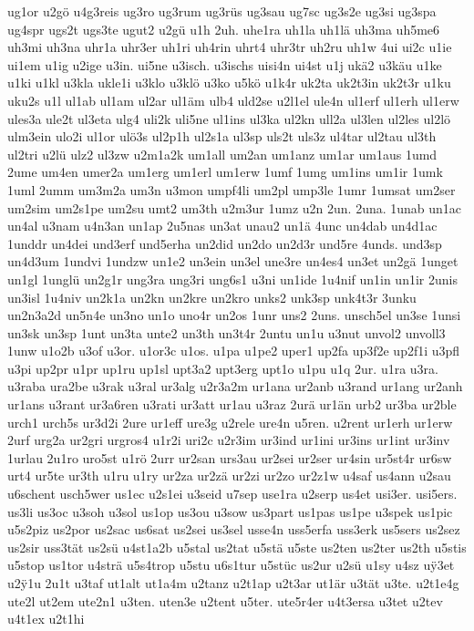 {ug1or
u2gö
u4g3reis
ug3ro
ug3rum
ug3rüs
ug3sau
ug7sc
ug3s2e
ug3si
ug3spa
ug4spr
ugs2t
ugs3te
ugut2
u2gü
u1h
2uh.
uhe1ra
uh1la
uh1lä
uh3ma
uh5me6
uh3mi
uh3na
uhr1a
uhr3er
uh1ri
uh4rin
uhrt4
uhr3tr
uh2ru
uh1w
4ui
ui2c
u1ie
ui1em
u1ig
u2ige
u3in.
ui5ne
u3isch.
u3ischs
uisi4n
ui4st
u1j
ukä2
u3käu
u1ke
u1ki
u1kl
u3kla
ukle1i
u3klo
u3klö
u3ko
u5kö
u1k4r
uk2ta
uk2t3in
uk2t3r
u1ku
uku2s
u1l
ul1ab
ul1am
ul2ar
ul1äm
ulb4
uld2se
u2l1el
ule4n
ul1erf
ul1erh
ul1erw
ules3a
ule2t
ul3eta
ulg4
uli2k
uli5ne
ul1ins
ul3ka
ul2kn
ull2a
ul3len
ul2les
ul2lö
ulm3ein
ulo2i
ul1or
ulö3s
ul2p1h
ul2s1a
ul3sp
uls2t
uls3z
ul4tar
ul2tau
ul3th
ul2tri
u2lü
ulz2
ul3zw
u2m1a2k
um1all
um2an
um1anz
um1ar
um1aus
1umd
2ume
um4en
umer2a
um1erg
um1erl
um1erw
1umf
1umg
um1ins
um1ir
1umk
1uml
2umm
um3m2a
um3n
u3mon
umpf4li
um2pl
ump3le
1umr
1umsat
um2ser
um2sim
um2s1pe
um2su
umt2
um3th
u2m3ur
1umz
u2n
2un.
2una.
1unab
un1ac
un4al
u3nam
u4n3an
un1ap
2u5nas
un3at
unau2
un1ä
4unc
un4dab
un4d1ac
1unddr
un4dei
und3erf
und5erha
un2did
un2do
un2d3r
und5re
4unds.
und3sp
un4d3um
1undvi
1undzw
un1e2
un3ein
un3el
une3re
un4es4
un3et
un2gä
1unget
un1gl
1unglü
un2g1r
ung3ra
ung3ri
ung6s1
u3ni
un1ide
1u4nif
un1in
un1ir
2unis
un3isl
1u4niv
un2k1a
un2kn
un2kre
un2kro
unks2
unk3sp
unk4t3r
3unku
un2n3a2d
un5n4e
un3no
un1o
uno4r
un2os
1unr
uns2
2uns.
unsch5el
un3se
1unsi
un3sk
un3sp
1unt
un3ta
unte2
un3th
un3t4r
2untu
un1u
u3nut
unvol2
unvoll3
1unw
u1o2b
u3of
u3or.
u1or3c
u1os.
u1pa
u1pe2
uper1
up2fa
up3f2e
up2f1i
u3pfl
u3pi
up2pr
u1pr
up1ru
up1sl
upt3a2
upt3erg
upt1o
u1pu
u1q
2ur.
u1ra
u3ra.
u3raba
ura2be
u3rak
u3ral
ur3alg
u2r3a2m
ur1ana
ur2anb
u3rand
ur1ang
ur2anh
ur1ans
u3rant
ur3a6ren
u3rati
ur3att
ur1au
u3raz
2urä
ur1än
urb2
ur3ba
ur2ble
urch1
urch5s
ur3d2i
2ure
ur1eff
ure3g
u2rele
ure4n
u5ren.
u2rent
ur1erh
ur1erw
2urf
urg2a
ur2gri
urgros4
u1r2i
uri2c
u2r3im
ur3ind
ur1ini
ur3ins
ur1int
ur3inv
1urlau
2u1ro
uro5st
u1rö
2urr
ur2san
urs3au
ur2sei
ur2ser
ur4sin
ur5st4r
ur6sw
urt4
ur5te
ur3th
u1ru
u1ry
ur2za
ur2zä
ur2zi
ur2zo
ur2z1w
u4saf
us4ann
u2sau
u6schent
usch5wer
us1ec
u2s1ei
u3seid
u7sep
use1ra
u2serp
us4et
usi3er.
usi5ers.
us3li
us3oc
u3soh
u3sol
us1op
us3ou
u3sow
us3part
us1pas
us1pe
u3spek
us1pic
u5s2piz
us2por
us2sac
us6sat
us2sei
us3sel
usse4n
uss5erfa
uss3erk
us5sers
us2sez
us2sir
uss3tät
us2sü
u4st1a2b
u5stal
us2tat
u5stä
u5ste
us2ten
us2ter
us2th
u5stis
u5stop
us1tor
u4strä
u5s4trop
u5stu
u6s1tur
u5stüc
us2ur
u2sü
u1sy
u4sz
u^^ff3et
u2^^ff1u
2u1t
u3taf
ut1alt
ut1a4m
u2tanz
u2t1ap
u2t3ar
ut1är
u3tät
u3te.
u2t1e4g
ute2l
ut2em
ute2n1
u3ten.
uten3e
u2tent
u5ter.
ute5r4er
u4t3ersa
u3tet
u2tev
u4t1ex
u2t1hi
}
